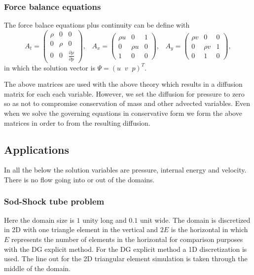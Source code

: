 \subsubsection{Force balance equations}
\label{NS} 
The force balace equations plus continuity can be define 
with
\begin{equation}
A_t=
  \begin{pmatrix}
\rho  &  0     & 0\\
0     &  \rho  & 0 \\
0     &  0     & \frac{\partial \rho}{\partial p} 
  \end{pmatrix}, \;\;\;
A_x=
  \begin{pmatrix}
\rho u &  0  &  1\\
0     &  \rho u & 0 \\ 
1     &  0  & 0 
  \end{pmatrix}, \;\;\;
A_y=
  \begin{pmatrix}
\rho v &  0  &  0  \\
0     &  \rho v &  1 \\
0     &  1      &  0 
  \end{pmatrix}, 
\label{A-matrix} 
\end{equation}
in which the solution vector is $\Psi=(u \;\; v \;\; p)^T$. 

The above matrices are used with the above theory 
which results in a diffusion matrix for each each variable. 
However, we set the diffusion for pressure to zero so 
as not to compromise conservation of mass and other advected variables. 
Even when we solve the governing equations in conservative form 
we form the above matrices in order to from the resulting diffusion. 

 
 



\subsection{Applications}
\label{Applications-comp} 

In all the below the solution variables are 
pressure, internal energy and velocity. 
There is no flow going into or out of the domains.  

\subsubsection{Sod-Shock tube problem} 
Here the domain size is $1$ unity long and $0.1$ unit wide. 
The domain is discretized in 2D with one triangle element in 
the vertical and $2E$ is the horizontal in which 
$E$ represents the number of elements in the horizontal 
for comparison purposes with the DG explicit method.  
For the DG explicit method a 1D discretization is used. 
The line out for the 2D triangular element simulation is 
taken through the middle of the domain. 

